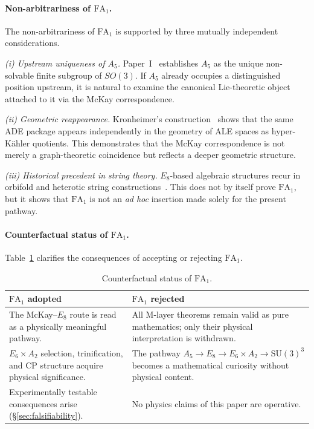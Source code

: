 \documentclass[sn-mathphys-num,Numbered]{sn-jnl}
\theoremstyle{thmstyleone}
\theoremstyle{thmstylethree}
\newcommand{\SU}{\mathrm{SU}}
\begin{document}
\paragraph{Non-arbitrariness of $\mathrm{FA}_1$.}
The non-arbitrariness of $\mathrm{FA}_1$ is supported by three mutually
independent considerations.

\emph{(i) Upstream uniqueness of $A_5$.}\enspace
Paper~I~\cite{Paper1} establishes $A_5$ as the unique non-solvable finite
subgroup of $SO(3)$.
If $A_5$ already occupies a distinguished position upstream, it is natural to
examine the canonical Lie-theoretic object attached to it via the McKay
correspondence.

\emph{(ii) Geometric reappearance.}\enspace
Kronheimer's construction~\cite{Kronheimer1989} shows that the same ADE
package appears independently in the geometry of ALE spaces as
hyper-K\"ahler quotients.
This demonstrates that the McKay correspondence is not merely a
graph-theoretic coincidence but reflects a deeper geometric structure.

\emph{(iii) Historical precedent in string theory.}\enspace
$E_8$-based algebraic structures recur in orbifold and heterotic string
constructions~\cite{GrossHarveyMartinecRohm1985}.
This does not by itself prove $\mathrm{FA}_1$, but it shows that
$\mathrm{FA}_1$ is not an \emph{ad hoc} insertion made solely for the
present pathway.

\paragraph{Counterfactual status of $\mathrm{FA}_1$.}
Table~\ref{tab:FA1-counterfactual} clarifies the consequences of accepting or
rejecting $\mathrm{FA}_1$.

\begin{table}[htb]
\centering
\caption{Counterfactual status of $\mathrm{FA}_1$.}\label{tab:FA1-counterfactual}
\begin{tabular}{p{}p{}}
\toprule
\textbf{$\mathrm{FA}_1$ adopted} & \textbf{$\mathrm{FA}_1$ rejected} \\
\midrule
The McKay--$E_8$ route is read as a physically meaningful pathway. &
All M-layer theorems remain valid as pure mathematics; only their physical
interpretation is withdrawn. \\[4pt]
$E_6 \times A_2$ selection, trinification, and CP structure acquire physical
significance. &
The pathway $A_5 \to E_8 \to E_6 \times A_2 \to \SU(3)^3$ becomes a
mathematical curiosity without physical content. \\[4pt]
Experimentally testable consequences arise (\S\ref{sec:falsifiability}). &
No physics claims of this paper are operative. \\
\bottomrule
\end{tabular}
\end{table}
\end{document}
